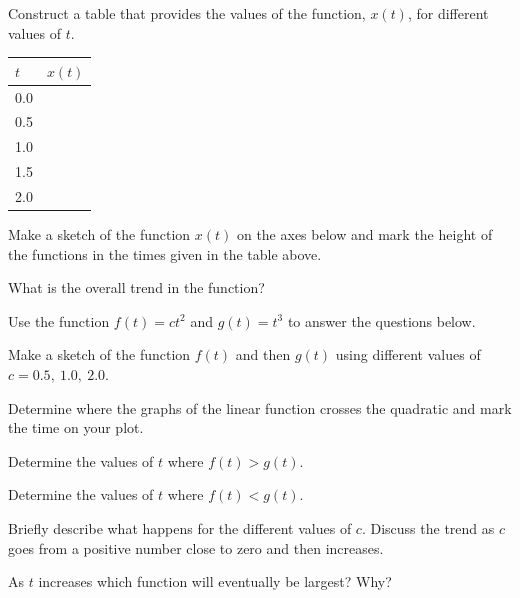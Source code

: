 \begin{problem}
  \begin{subproblem}
  \item Construct a table that provides the values of the function,
    $x(t)$, for different values of $t$.

    \begin{tabular}{l|l}
      $t$ & $x(t)$ \\ \hline
      0.0 & \\ [12pt]
      0.5 & \\ [12pt]
      1.0 & \\ [12pt]
      1.5 & \\ [12pt]
      2.0 & 
    \end{tabular}

  \item Make a sketch of the function $x(t)$ on the axes below and
    mark the height of the functions in the times given in the table above.

    \scalebox{0.7}{}

  \item What is the overall trend in the function?
    \vspace{2em}

  \end{subproblem}

  \clearpage

\item Use the function $f(t)=c t^2$ and $g(t)=t^3$ to answer the
  questions below.

  \scalebox{0.7}{}

  \begin{subproblem}
  \item Make a sketch of the function $f(t)$ and then $g(t)$
    using different values of $c=0.5,~1.0,~2.0$.
  \item Determine where the graphs of the linear function crosses the
    quadratic and mark the time on your plot.
  \item Determine the values of $t$ where $f(t)>g(t)$. 
    \vfill
  \item Determine the values of $t$ where $f(t)<g(t)$.
    \vfill
  \item Briefly describe what happens for the different values of
    $c$. Discuss the trend as $c$ goes from a positive number close to
    zero and then increases.
    \vfill
  \item As $t$ increases which function will eventually be largest?
    Why?
    \vfill
  \end{subproblem}


\end{problem}
